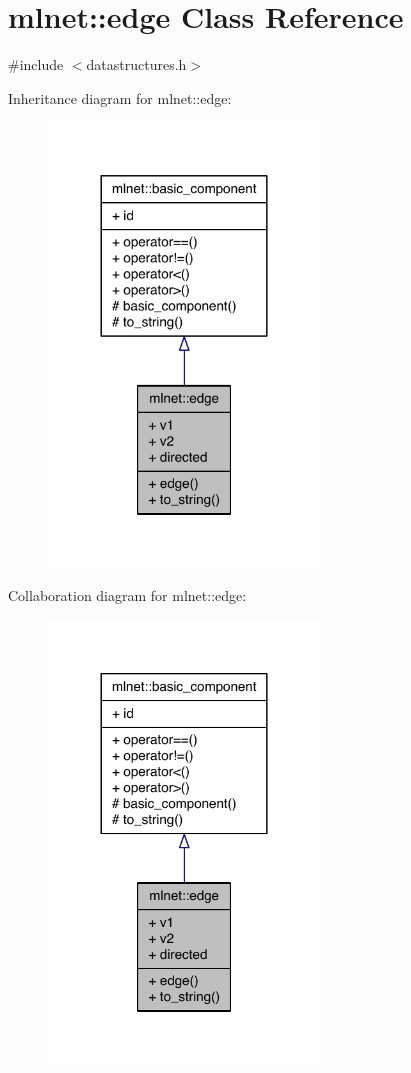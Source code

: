 \hypertarget{classmlnet_1_1edge}{\section{mlnet\+:\+:edge Class Reference}
\label{classmlnet_1_1edge}
}


{\ttfamily \#include $<$datastructures.\+h$>$}



Inheritance diagram for mlnet\+:\+:edge\+:\nopagebreak
\begin{figure}[H]
\begin{center}
\leavevmode
\includegraphics[width=204pt]{classmlnet_1_1edge__inherit__graph}
\end{center}
\end{figure}


Collaboration diagram for mlnet\+:\+:edge\+:\nopagebreak
\begin{figure}[H]
\begin{center}
\leavevmode
\includegraphics[width=204pt]{classmlnet_1_1edge__coll__graph}
\end{center}
\end{figure}

